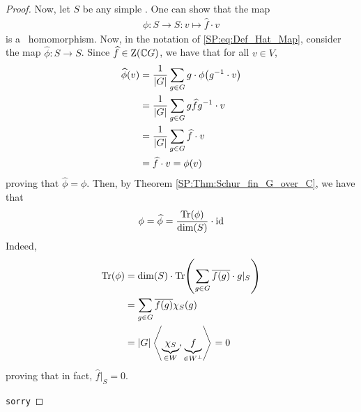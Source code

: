 \begin{proof}
    Now, let $S$ be any simple \CGM. One can show that the map
    \begin{align*}
        \phi : S \to S : v \mapsto \hat{f} \cdot v
    \end{align*}
    is a \CGM\ homomorphism. %
    Now, in the notation of \eqref{SP:eq:Def_Hat_Map}, consider the map $\hat{\phi} : S \to S$. Since $\widehat{f} \in \operatorname{Z}\!\left( \mathbb{C} G \right)$, we have that for all $v \in V$,
    \begin{align*}
        \widehat{\phi}(v) &= \frac{1}{\left\lvert G \right\rvert} \sum_{g \in G} g \cdot \phi\!\left( g^{-1} \cdot v \right) \\
        &= \frac{1}{\left\lvert G \right\rvert} \sum_{g \in G} g\widehat{f}g^{-1} \cdot v \\
        &= \frac{1}{\left\lvert G \right\rvert} \sum_{g \in G} \widehat{f} \cdot v \\
        &= \widehat{f} \cdot v = \phi(v)
    \end{align*}
    proving that $\hat{\phi} = \phi$. Then, by Theorem \ref{SP:Thm:Schur_fin_G_over_C}, we have that %
    \begin{align*}
        \phi = \widehat{\phi} = \frac{\operatorname{Tr}\!\left( \phi \right)}{\dim\!\left( S \right)} \cdot \operatorname{id}
    \end{align*}
    Indeed,
    \begin{align*}
        \operatorname{Tr}\!\left( \phi \right) &= \dim\!\left( S \right) \cdot \operatorname{Tr}\!\left( \sum_{g \in G} \overline{f(g)} \cdot g\vert_{S} \right) \\
        &= \sum_{g \in G} \overline{f(g)} \chi_S(g) \\
        &= \left\lvert G \right\rvert \left\langle \underbrace{\chi_S}_{\in W}, \underbrace{f}_{\in W^\perp} \right\rangle = 0
    \end{align*}
    proving that in fact, $\hat{f}\vert_S = 0$.
    
    \verb|sorry| %
\end{proof}